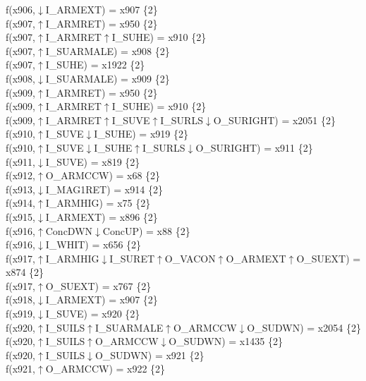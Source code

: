 f(x906,$\downarrow$I\_ARMEXT) = x907 \{2\} \\  
f(x907,$\uparrow$I\_ARMRET) = x950 \{2\} \\  
f(x907,$\uparrow$I\_ARMRET$\uparrow$I\_SUHE) = x910 \{2\} \\  
f(x907,$\uparrow$I\_SUARMALE) = x908 \{2\} \\  
f(x907,$\uparrow$I\_SUHE) = x1922 \{2\} \\  
f(x908,$\downarrow$I\_SUARMALE) = x909 \{2\} \\  
f(x909,$\uparrow$I\_ARMRET) = x950 \{2\} \\  
f(x909,$\uparrow$I\_ARMRET$\uparrow$I\_SUHE) = x910 \{2\} \\  
f(x909,$\uparrow$I\_ARMRET$\uparrow$I\_SUVE$\uparrow$I\_SURLS$\downarrow$O\_SURIGHT) = x2051 \{2\} \\  
f(x910,$\uparrow$I\_SUVE$\downarrow$I\_SUHE) = x919 \{2\} \\  
f(x910,$\uparrow$I\_SUVE$\downarrow$I\_SUHE$\uparrow$I\_SURLS$\downarrow$O\_SURIGHT) = x911 \{2\} \\  
f(x911,$\downarrow$I\_SUVE) = x819 \{2\} \\  
f(x912,$\uparrow$O\_ARMCCW) = x68 \{2\} \\  
f(x913,$\downarrow$I\_MAG1RET) = x914 \{2\} \\  
f(x914,$\uparrow$I\_ARMHIG) = x75 \{2\} \\  
f(x915,$\downarrow$I\_ARMEXT) = x896 \{2\} \\  
f(x916,$\uparrow$ConcDWN$\downarrow$ConcUP) = x88 \{2\} \\  
f(x916,$\downarrow$I\_WHIT) = x656 \{2\} \\  
f(x917,$\uparrow$I\_ARMHIG$\downarrow$I\_SURET$\uparrow$O\_VACON$\uparrow$O\_ARMEXT$\uparrow$O\_SUEXT) = x874 \{2\} \\  
f(x917,$\uparrow$O\_SUEXT) = x767 \{2\} \\  
f(x918,$\downarrow$I\_ARMEXT) = x907 \{2\} \\  
f(x919,$\downarrow$I\_SUVE) = x920 \{2\} \\  
f(x920,$\uparrow$I\_SUILS$\uparrow$I\_SUARMALE$\uparrow$O\_ARMCCW$\downarrow$O\_SUDWN) = x2054 \{2\} \\  
f(x920,$\uparrow$I\_SUILS$\uparrow$O\_ARMCCW$\downarrow$O\_SUDWN) = x1435 \{2\} \\  
f(x920,$\uparrow$I\_SUILS$\downarrow$O\_SUDWN) = x921 \{2\} \\  
f(x921,$\uparrow$O\_ARMCCW) = x922 \{2\} \\  
